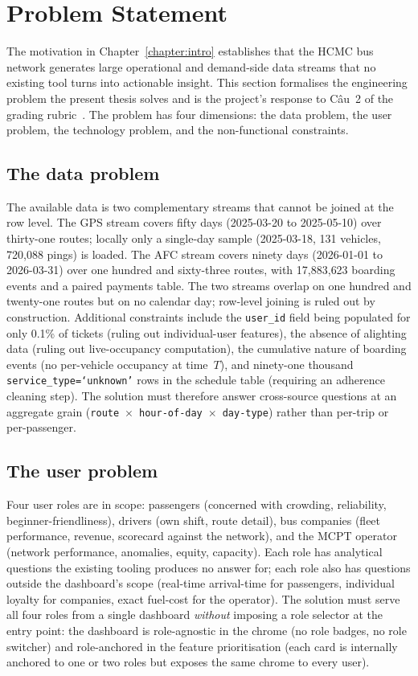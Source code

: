 \section{Problem Statement}
\label{sec:proposed:problem}

The motivation in Chapter~\ref{chapter:intro} establishes that
the HCMC bus network generates large operational and demand-side
data streams that no existing tool turns into actionable insight.
This section formalises the engineering problem the present
thesis solves and is the project's response to Câu~2 of the
grading rubric~\cite{rubric}. The problem has four dimensions:
the data problem, the user problem, the technology problem, and
the non-functional constraints.

\subsection{The data problem}

The available data is two complementary streams that cannot be
joined at the row level. The GPS stream covers fifty days
(2025-03-20 to 2025-05-10) over thirty-one routes; locally only
a single-day sample (2025-03-18, 131 vehicles, 720{,}088 pings)
is loaded. The AFC stream covers ninety days
(2026-01-01 to 2026-03-31) over one hundred and sixty-three
routes, with 17{,}883{,}623 boarding events and a paired
payments table. The two streams overlap on one hundred and
twenty-one routes but on no calendar day; row-level joining is
ruled out by construction. Additional constraints include the
\texttt{user\_id} field being populated for only 0.1\% of tickets
(ruling out individual-user features), the absence of alighting
data (ruling out live-occupancy computation), the cumulative
nature of boarding events (no per-vehicle occupancy at time~$T$),
and ninety-one thousand \texttt{service\_type=`unknown'} rows in
the schedule table (requiring an adherence cleaning step). The
solution must therefore answer cross-source questions at an
aggregate grain
(\texttt{route}~$\times$~\texttt{hour-of-day}~$\times$~\texttt{day-type})
rather than per-trip or per-passenger.

\subsection{The user problem}

Four user roles are in scope: passengers (concerned with
crowding, reliability, beginner-friendliness), drivers (own
shift, route detail), bus companies (fleet performance,
revenue, scorecard against the network), and the MCPT operator
(network performance, anomalies, equity, capacity). Each role
has analytical questions the existing tooling produces no answer
for; each role also has questions outside the dashboard's scope
(real-time arrival-time for passengers, individual loyalty for
companies, exact fuel-cost for the operator). The solution must
serve all four roles from a single dashboard \emph{without}
imposing a role selector at the entry point: the dashboard is
role-agnostic in the chrome (no role badges, no role switcher)
and role-anchored in the feature prioritisation (each card is
internally anchored to one or two roles but exposes the same
chrome to every user).

